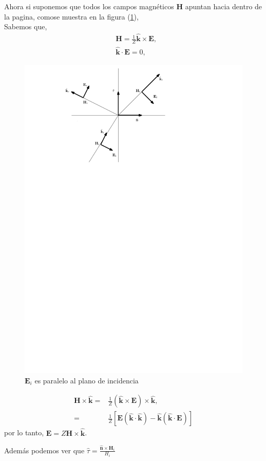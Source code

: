 \documentclass[11pt,fleqn]{book} %
\begin{document}
Ahora si suponemos que todos los campos magn\'eticos \textbf{H} apuntan hacia dentro de la pagina, comose muestra en la figura (\ref{grafica}),\\
Sabemos que,
\begin{equation*}
\begin{split}
&\textbf{H}=\frac{1}{Z} \hat{\textbf{k}}\times \textbf{E},\\
&\hat{\textbf{k}}\cdot\textbf{E}=0,
\end{split}
\end{equation*}
\begin{figure}[hbtp]
 \centering
 \includegraphics[scale=0.6]{Pictures/fresnell.pdf}
 \caption{$\textbf{E}_{i}$ es paralelo al plano de incidencia}
\label{grafica}
 \end{figure}


\begin{obs}
\begin{equation}
\begin{split}
\textbf{H}\times\hat{\textbf{k}}=&\frac{1}{Z} (\hat{\textbf{k}}\times \textbf{E})\times \hat{\textbf{k}},\\
=&\frac{1}{Z}[\textbf{E}(\hat{\textbf{k}}\cdot\hat{\textbf{k}})-\hat{\textbf{k}}(\hat{\textbf{k}}\cdot\textbf{E})]
\end{split}
\end{equation}
por lo tanto, $\textbf{E}=Z\textbf{H}\times\hat{\textbf{k}}$.
\end{obs}
 Adem\'as podemos ver que $\hat{\tau}=\frac{\hat{\textbf{n}}\times\textbf{H}_i}{H_i}$
\end{document}
